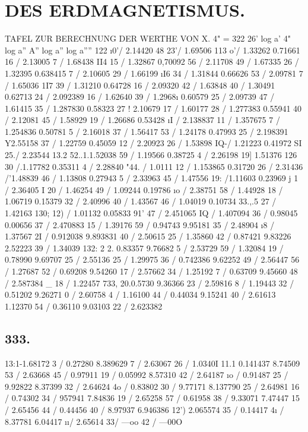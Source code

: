 \documentclass[12pt,a4paper]{article}
\begin{document}
\newpage


\section*{DES ERDMAGNETISMUS.}
TAFEL ZUR BERECHNUNG DER WERTHE VON X. 4" = 322\textdegree{} 26' log a' 4" log a'' A'' log a'' log a'''' 122\textdegree{} \i{}0'/ 2.14420 48\textdegree{} 23'/ 1.69506 113\textdegree{} o'/ 1.33262 0.71661 16 / 2.13005 7 / 1.68438 II4 15 / 1.32867 0,70092 56 / 2.11708 49 / 1.67335 26 / 1.32395 0.638415 7 / 2.10605 29 / 1.66199 \i{}I6 34 / 1.31844 0.66626 53 / 2.09781 7 / 1.65036 1I7 39 / 1.31210 0.64728 16 / 2.09320 42 / 1.63848 40 / 1.30491 0.62713 24 / 2.092389 16 / 1.62640 39 / 1.2968\i{} 0.60579 25 / 2.09739 47 / 1.61415 35 / 1.287830 0.58323 27 ! 2.10679 17 / 1.60177 28 / 1.277383 0.55941 40 / 2.12081 45 / 1.58929 19 / 1.26686 0.53428 \i{}I / 2.138837 11 / 1.357675 7 /  1.254836 0.50781 5 / 2.16018 37 / 1.56417 53 / 1.24178 0.47993 25 / 2.198391 Y2.55158 37 / 1.22759 0.45059 12 / 2.20923 26 / 1.53898 IQ-/ 1.21223 0.41972 SI 25./ 2.23544 13.2 52..1.1.52038 59 / 1.19566 0.38725 4 / 2.26198 19\textdegree{}] 1.51376 126 \textdegree{} 30 /.1.17782 0.35311 4 / 2.28840 "44. / 1.0111 12 / 1.153865 0.31720 26 / 2.31436 /'1.48839 46 / 1.13808 0.27943 5 / 2.33963 45 / 1.47556 \textdegree{} 19: /1.11603 0.23969 j 1 / 2.36405 I 20 / 1.46254 49 / 1.09244 0.19786 \i{}o / 2.38751 58 / 1.44928 18 / 1.06719 0.15379 32 / 2.40996 40 / 1.43567 46 / 1.04019 0.10734 33.,.5 27 / 1.42163 130; 12) / 1.01132 0.05833 91' 47 / 2.451065 IQ / 1.407094 36 / 0.98045 0.00656 37 / 2.470883 15 / 1.39176 59 / 0.94743 9.95181 35 / 2.48904 \i{}8 / 1.37567 2I / 0.912038 9.893831 40 / 2.50615 25 / 1.35860 42 / 0.87421 9.83226 2.52223 39 / 1.34039 132: 2 2. 0.83357 9.76682 5 /  2.53729 59 / 1.32084 19 / 0.78990 9.69707 25 / 2.55136 25 / 1.29975 36 / 0.742386 9.62252 49 / 2.56447 56 / 1.27687 52 / 0.69208 9.54260 17 / 2.57662 34 / 1.25192 7 / 0.63709 9.45660 48 / 2.587384 \_ 18 / 1.22457 733, 20.0.5730 9.36366 23 / 2.59816 8 / 1.19443 32 / 0.51202 9.26271 0 /  2.60758 4 / 1.16100 44 / 0.44034 9.15241 40 / 2.61613 1.12370 54 / 0.36110 9.03103 22 / 2.623382

\subsection*{333.}
13:1-1.68172 3 / 0.27280 8.389629 7 /  2.63067 26 / 1.0340I 11.1 0.141437 8.74509 53 / 2.63668 45 / 0.97911 19 / 0.05992 8.57310 42 / 2.64187 \i{}o / 0.91487 25 / 9.92822 8.37399 32 / 2.64624 4o / 0.83802 30 / 9.77171 8.137790 25 / 2.64981 16 / 0.74302 34 / 957941 7.84836 19 / 2.65258 57 / 0.61958 38 / 9.33071 7.47447 15 / 2.65456 44 / 0.44456 40 / 8.97937 6.946386 12') 2.065574 35 / 0.14417 4\i{} / 8.37781 6.04417 \i{}\i{}/ 2.65614 33/ ---oo 42 / ---00O
\end{document}
